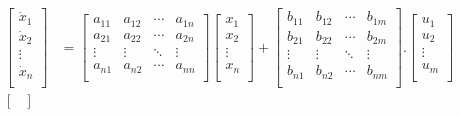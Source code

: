             \vspace{20pt}
            \begin{align}
                \begin{bmatrix}
                    \dot{x}_{1}\\
                    \dot{x}_{2}\\
                    \vdots\\
                    \dot{x}_{n}\\
                    \end{bmatrix}&=
                    \begin{bmatrix}
                    a_{11} & a_{12} & \cdots & a_{1n}\\
                    a_{21} & a_{22} & \cdots & a_{2n}\\
                    \vdots & \vdots & \ddots & \vdots\\
                    a_{n1} & a_{n2} & \cdots & a_{nn}\\
                    \end{bmatrix}
                    \begin{bmatrix}
                    x_{1}\\
                    x_{2}\\
                    \vdots\\
                    x_{n}\\
                    \end{bmatrix}+
                    \begin{bmatrix}
                    b_{11} & b_{12} & \cdots & b_{1m}\\
                    b_{21} & b_{22} & \cdots & b_{2m}\\
                    \vdots & \vdots & \ddots & \vdots\\
                    b_{n1} & b_{n2} & \cdots & b_{nm}\\
                    \end{bmatrix}.
                    \begin{bmatrix}
                    u_{1}\\
                    u_{2}\\
                    \vdots\\
                    u_{m}\\
                    \end{bmatrix}\label{eq:FullSSx}\\
                    \begin{bmatrix}

\end{bmatrix}
\end{align}
